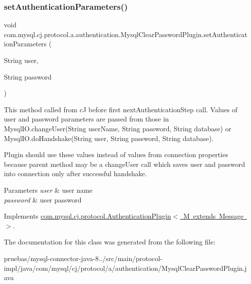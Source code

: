 \subsubsection{\texorpdfstring{set\+Authentication\+Parameters()}{setAuthenticationParameters()}}
{\footnotesize\ttfamily void com.\+mysql.\+cj.\+protocol.\+a.\+authentication.\+Mysql\+Clear\+Password\+Plugin.\+set\+Authentication\+Parameters (\begin{DoxyParamCaption}\item[{String}]{user,  }\item[{String}]{password }\end{DoxyParamCaption})}

This method called from cJ before first next\+Authentication\+Step call. Values of user and password parameters are passed from those in Mysql\+I\+O.\+change\+User(String user\+Name, String password, String database) or Mysql\+I\+O.\+do\+Handshake(String user, String password, String database).

Plugin should use these values instead of values from connection properties because parent method may be a change\+User call which saves user and password into connection only after successful handshake.


\begin{DoxyParams}{Parameters}
{\em user} & user name \\
\hline
{\em password} & user password \\
\hline
\end{DoxyParams}


Implements \mbox{\hyperlink{interfacecom_1_1mysql_1_1cj_1_1protocol_1_1_authentication_plugin_a22458c3992dbf9f91560d75a99e234d3}{com.\+mysql.\+cj.\+protocol.\+Authentication\+Plugin$<$ M extends Message $>$}}.



The documentation for this class was generated from the following file\+:\begin{DoxyCompactItemize}
\item 
pruebas/mysql-\/connector-\/java-\/8../src/main/protocol-\/impl/java/com/mysql/cj/protocol/a/authentication/Mysql\+Clear\+Password\+Plugin.\+java\end{DoxyCompactItemize}
